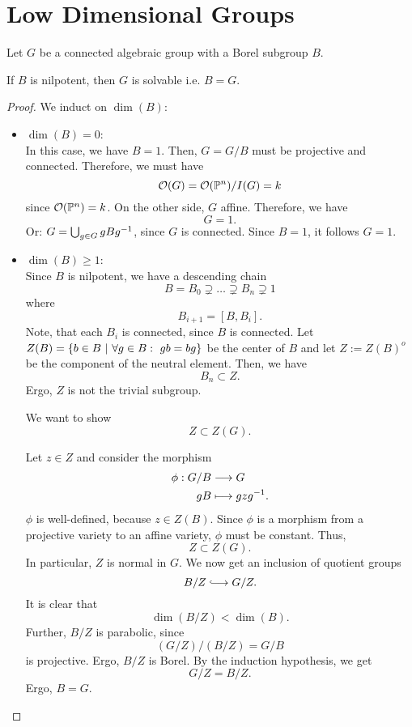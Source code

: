 \section{Low Dimensional Groups}
\begin{lemma}
	Let $G$ be a connected algebraic group with a Borel subgroup $B$.
	
If $B$ is nilpotent, then $G$ is solvable i.e. $B = G$.
\end{lemma}
\begin{proof}
	We induct on $\dim(B)$:
	\begin{itemize}
		\item $\dim(B) = 0$:\\
		In this case, we have $B = 1$. Then, $G=G/B$ must be projective and connected. Therefore, we must have
		\[ \mathcal{O}(G) = \mathcal{O}(\mathbb{P}^n) / I(G) = k \]
		since $\mathcal{O}(\mathbb{P}^n) = k$. On the other side, $G$ affine. Therefore, we have
		\[ G = 1. \]
		Or: $G = \bigcup_{g\in G} gBg^{-1}$, since $G$ is connected. Since $B = 1$, it follows $G = 1$.
		\item $\dim(B) \geq 1$:\\
		Since $B$ is nilpotent, we have a descending chain
		\[ B = B_0 \supsetneq \ldots \supsetneq B_n \supsetneq 1 \]
		where
		\[ B_{i+1} = [B, B_i]. \]
		Note, that each $B_i$ is connected, since $B$ is connected.
		Let $Z(B) = \left\lbrace b \in B ~ | ~ \forall g \in B:~ gb=bg\right\rbrace$ be the center of $B$ and let $Z:= Z(B)^o$ be the component of the neutral element. Then, we have
		\[ B_{n} \subset Z.  \]
		Ergo, $Z$ is not the trivial subgroup.
		
		We want to show
		\[ Z \subset Z(G). \]
		
		Let $z \in Z$ and consider the morphism
		\begin{align*}
		\phi : G/B & \overset{}{\longrightarrow} G\\
		gB & \longmapsto gzg^{-1}.
		\end{align*}
		$\phi$ is well-defined, because $z \in Z(B)$. Since $\phi$ is a morphism from a projective variety to an affine variety, $\phi$ must be constant. Thus,
		\[ Z \subset Z(G). \]
		In particular, $Z$ is normal in $G$. We now get an inclusion of quotient groups
		\[ B/Z \Inj{} G/Z. \]
		It is clear that
		\[ \dim(B/Z) < \dim(B). \]
		Further, $B/Z$ is parabolic, since
		\[ (G/Z) / (B/Z) = G/B \]
		is projective. Ergo, $B/Z$ is Borel. By the induction hypothesis, we get
		\[ G/Z = B/Z. \]
		Ergo, $B = G$.
	\end{itemize}
\end{proof}

